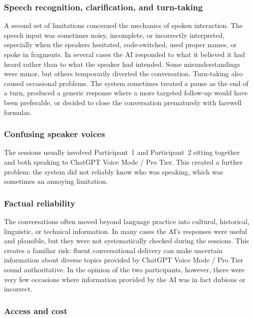 \documentclass[11pt,a4paper]{article}
\begin{document}
\subsubsection*{Speech recognition, clarification, and turn-taking}

A second set of limitations concerned the mechanics of spoken interaction. The speech input was sometimes noisy, incomplete, or incorrectly interpreted, especially when the speakers hesitated, code-switched, used proper names, or spoke in fragments. In several cases the AI responded to what it believed it had heard rather than to what the speaker had intended. Some misunderstandings were minor, but others temporarily diverted the conversation. Turn-taking also caused occasional problems. The system sometimes treated a pause as the end of a turn, produced a generic response where a more targeted follow-up would have been preferable, or decided to close the conversation prematurely with farewell formulas.

\subsubsection*{Confusing speaker voices}

The sessions usually involved Participant~1 and Participant~2 sitting together and both speaking to ChatGPT Voice Mode / Pro Tier. This created a further problem: the system did not reliably know who was speaking, which was sometimes an annoying limitation.

\subsubsection*{Factual reliability}

The conversations often moved beyond language practice into cultural, historical, linguistic, or technical information. In many cases the AI's responses were useful and plausible, but they were not systematically checked during the sessions. This creates a familiar risk: fluent conversational delivery can make uncertain information about diverse topics provided by ChatGPT Voice Mode / Pro Tier sound authoritative. In the opinion of the two participants, however, there were very few occasions where information provided by the AI was in fact dubious or incorrect.

\subsubsection*{Access and cost}
\end{document}
